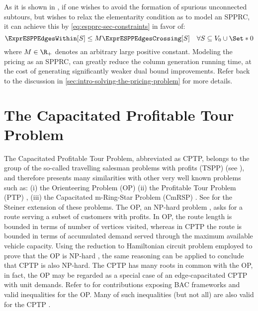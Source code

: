 As it is shown in \textcite{beasley1989},
if one wishes to avoid the formation of spurious unconnected subtours,
but wishes to relax the elementarity condition as to model an SPPRC,
it can achieve this by \cref{eq:espprc-sec-constraints} in favor of:
\begin{equation}
	\ExprESPPEdgesWithin[S] \le M \ExprESPPEdgesCrossing[S] \quad \forall S \subseteq V_0 \cup \Set*{0}
\end{equation}
where $M \in \R_+$ denotes an arbitrary large positive constant.
Modeling the pricing as an SPPRC, can greatly reduce
the column generation running time, at the cost
of generating significantly weaker dual bound improvements.
Refer back to the discussion in \cref{sec:intro-solving-the-pricing-problem}
for more details.

\section{The Capacitated Profitable Tour Problem}
\label{sec:the-capacitated-profitable-tour-problem}

The Capacitated Profitable Tour Problem, abbreviated as CPTP,
belongs to the group of the so-called travelling salesman
problems with profits (TSPP) (see \cite{feillet2005}),
and therefore presents many similarities with other very well known
problems such as:
(i) the Orienteering Problem (OP) \parencite{golden1987, laporte1990}
(ii) the Profitable Tour Problem (PTP) \parencite{dellamico1995},
(iii) the Capacitated m-Ring-Star Problem (CmRSP) \parencite{baldacci2007capacitated}.
See \textcite{letchford2013} for the Steiner extension of these problems.
The OP, an NP-hard problem \parencite{laporte1990}, asks for a route serving
a subset of customers with profits.
In OP, the route length is bounded in terms of number of vertices visited,
whereas in CPTP the route is bounded in terms of accumulated demand served
through the maximum available vehicle capacity.
Using the reduction to Hamiltonian circuit problem
employed to prove that the OP is NP-hard \parencite{laporte1990},
the same reasoning can be applied to conclude that CPTP is also NP-hard.
The CPTP has many roots in common with the OP, in fact,
the OP may be regarded as a special case of an edge-capacitated CPTP with unit demands.
Refer to \textcite{fischetti1998, gendreau1998} for contributions
exposing BAC frameworks and valid inequalities for the OP.
Many of such inequalities (but not all) are also valid for the CPTP \parencite{jepsen2014}.

